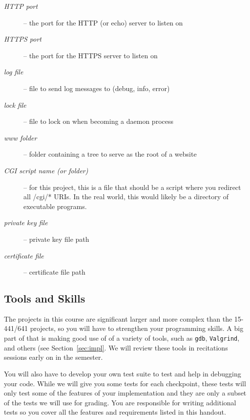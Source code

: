 \begin{description}
	\item[\textnormal{\emph{HTTP port}}] -- the port for the HTTP (or echo) server
                                          to listen on

	\item[\textnormal{\emph{HTTPS port}}] -- the port for the HTTPS server to
                                           listen on

	\item[\textnormal{\emph{log file}}] -- file to send log messages to
                                         (debug, info, error)

	\item[\textnormal{\emph{lock file}}] -- file to lock on when becoming a daemon
                                          process

	\item[\textnormal{\emph{www folder}}] -- folder containing a tree to serve as
                                           the root of a website

	\item[\textnormal{\emph{CGI script name (or folder)}}] --
										   for this project, this is a file that should be
										   a script where you redirect all
										   /cgi/* URIs. In the real world, this
										   would likely be a directory of
										   executable programs.

	\item[\textnormal{\emph{private key file}}] -- private key file path

	\item[\textnormal{\emph{certificate file}}] -- certificate file path
\end{description}


\subsection{Tools and Skills}
The projects in this course are significant larger and more complex
than the 15-441/641 projects, so you will have to strengthen your
programming skills.  A big part of that is making good use of of a
variety of tools, such as {\tt gdb}, {\tt Valgrind}, and others (see
Section~\ref{sec:impl}.  We
will review these tools in recitations sessions early on in the semester.

You will also have to develop your own test suite to test and help in
debugging your code.  While we will give you some tests for each
checkpoint, these tests will only test some of the features of your
implementation and they are only a subset of the tests we will use for
grading.  You are responsible for writing additional tests so you
cover all the features and requirements listed in this handout.

